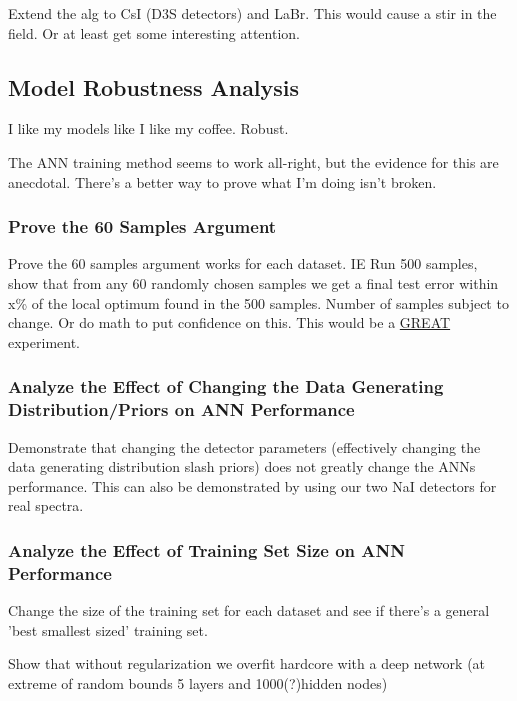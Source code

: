 \documentclass[10pt,letterpaper]{article}
\begin{document}
    Extend the alg to CsI (D3S detectors) and LaBr. This would cause a stir in the field. Or at least get some interesting attention. 

\subsection{Model Robustness Analysis}

I like my models like I like my coffee. Robust.

The ANN training method seems to work all-right, but the evidence for this are anecdotal. There's a better way to prove what I'm doing isn't broken.


\subsubsection{Prove the 60 Samples Argument}

    Prove the 60 samples argument works for each dataset. IE Run 500 samples, show that from any 60 randomly chosen samples we get a final test error within x\% of the local optimum found in the 500 samples. Number of samples subject to change. Or do math to put confidence on this. This would be a \underline{GREAT} experiment.    

\subsubsection{Analyze the Effect of Changing the Data Generating Distribution/Priors on ANN Performance}

    Demonstrate that changing the detector parameters (effectively changing the data generating distribution slash priors) does not greatly change the ANNs performance. This can also be demonstrated by using our two NaI detectors for real spectra.
    
\subsubsection{Analyze the Effect of Training Set Size on ANN Performance} 


    Change the size of the training set for each dataset and see if there's a general 'best smallest sized' training set.
    
    


Show  that  without  regularization  we  overfit  hardcore  with a deep network (at extreme of random bounds 5 layers and 1000(?)hidden nodes)
\end{document}
